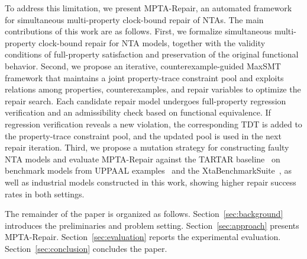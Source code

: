 To address this limitation, we present MPTA-Repair, an automated
framework for simultaneous multi-property clock-bound repair of NTAs.
The main contributions of this work are as follows. First, we formalize
simultaneous multi-property clock-bound repair for NTA models, together
with the validity conditions of full-property satisfaction and
preservation of the original functional behavior. Second, we propose an
iterative, counterexample-guided MaxSMT framework that maintains a joint
property-trace constraint pool and exploits relations among properties,
counterexamples, and repair variables to optimize the repair search.
Each candidate repair model undergoes full-property regression
verification and an admissibility check based on functional equivalence.
If regression verification reveals a new violation, the corresponding
TDT is added to the property-trace constraint pool, and the updated pool
is used in the next repair iteration. Third, we propose a mutation
strategy for constructing faulty NTA models and evaluate MPTA-Repair
against the TARTAR baseline~\cite{kolbl2019clock} on benchmark models
from UPPAAL examples~\cite{behrmann2004tutorial} and the
XtaBenchmarkSuite~\cite{farkas2018benchmarks}, as well as industrial
models constructed in this work, showing higher repair success rates in
both settings.

The remainder of the paper is organized as follows.
Section~\ref{sec:background} introduces the preliminaries and problem
setting. Section~\ref{sec:approach} presents MPTA-Repair.
Section~\ref{sec:evaluation} reports the experimental evaluation.
Section~\ref{sec:conclusion} concludes the paper.
